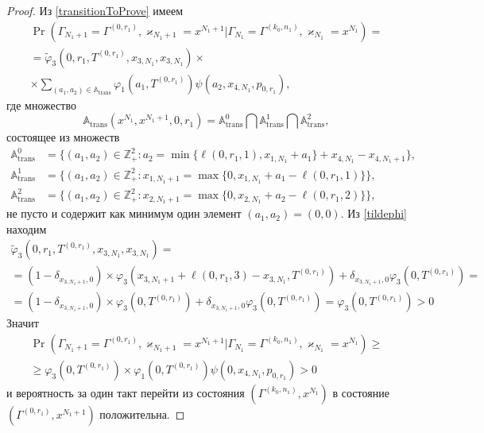 \documentclass[a4paper,12pt,russian]{extarticle}
\begin{document}
\begin{proof}
Из \eqref{transitionToProve} имеем
\begin{multline*}
\Pr (\Gamma_{N_1+1}=\Gamma^{(0,r_1)},\varkappa_{N_1+1}=x^{N_1+1} | \Gamma_{N_1}=\Gamma^{(k_0,n_1)},\varkappa_{N_1}=x^{N_1})=\\
=\widetilde{\varphi}_3(0,r_1,T^{(0,r_1)},x_{3,N_1},x_{3,N_1})\times \\
\times
\sum_{(a_1,a_2)\in {\mathbb A}_{\mathrm{trans}}}\varphi_1(a_1,T^{(0,r_1)})  \psi(a_2,x_{4,N_1}, p_{0,r_1}),
\end{multline*}
где множество 
\begin{equation*}
{\mathbb A}_{\mathrm{trans}}(x^{N_1},x^{N_1+1},0,r_1) = {\mathbb A}_{\mathrm{trans}}^0 \bigcap {\mathbb A}_{\mathrm{trans}}^1\bigcap {\mathbb A}_{\mathrm{trans}}^2,
\end{equation*}
состоящее из множеств 
\begin{align*}
{\mathbb A}_{\mathrm{trans}}^0 &= \{(a_1,a_2) \in \mathbb{Z}_+^2 \colon a_2 = \min{\{\ell(0,r_1,1), x_{1,N_1}+a_1}\} +x_{4,N_1}-x_{4,N_1+1} \}, \\
{\mathbb A}_{\mathrm{trans}}^1 &= \{(a_1,a_2) \in \mathbb{Z}_+^2 \colon x_{1,N_1+1} =\max{\{0,x_{1,N_1}+a_1-\ell(0,r_1,1)\}}\},\\
 {\mathbb A}_{\mathrm{trans}}^2 &= \{(a_1,a_2) \in \mathbb{Z}_+^2 \colon  x_{2,N_1+1}=\max{\{0,x_{2,N_1}+a_2-\ell(0,r_1,2)\}}\},
\end{align*}
не пусто и содержит как минимум один элемент $(a_1,a_2)=(0,0)$. Из \eqref{tildephi} находим
\begin{multline*}
\widetilde{\varphi}_3(0,r_1,T^{(0,r_1)},x_{3,N_1},x_{3,N_1})=\\=(1-\delta_{x_{3,N_1+1},0}) \times\varphi_3(x_{3,N_1+1} + \ell (0,r_1,3) - x_{3,N_1},T^{(0,r_1)} )
+\delta_{x_{3,N_1+1},0} \varphi_3 (0,T^{(0,r_1)}) = \\=
(1-\delta_{x_{3,N_1+1},0}) \times\varphi_3(0,T^{(0,r_1)} )
+\delta_{x_{3,N_1+1},0} \varphi_3 (0,T^{(0,r_1)}) = \varphi_3 (0,T^{(0,r_1)})> 0
\end{multline*}
Значит
\begin{multline*}
\Pr (\Gamma_{N_1+1}=\Gamma^{(0,r_1)},\varkappa_{N_1+1}=x^{N_1+1} | \Gamma_{N_1}=\Gamma^{(k_0,n_1)},\varkappa_{N_1}=x^{N_1})\geqslant\\
\geqslant\varphi_3 (0,T^{(0,r_1)})
\times
\varphi_1(0,T^{(0,r_1)})  \psi(0,x_{4,N_1}, p_{0,r_1}) > 0
\end{multline*}
и вероятность за один такт перейти из состояния $(\Gamma^{(k_0,n_1)}, x^{N_1})$ в состояние $ (\Gamma^{(0,r_1)}, x^{N_1+1})$ положительна.


\end{proof}
\end{document}
